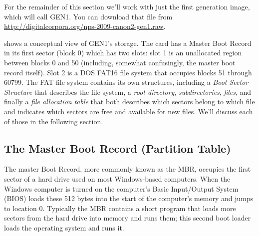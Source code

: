 For the remainder of this section we'll work with just the first
generation image, which will call GEN1. You can download that file
from \url{http://digitalcorpora.org/nps-2009-canon2-gen1.raw}.


 shows a conceptual view of
GEN1's storage. The card has a Master Boot Record in its
first sector (block 0) which has two slots: slot 1 is an unallocated
region between blocks 0 and 50 (including, somewhat confusingly, the
master boot record itself). Slot 2 is a DOS FAT16 file system that
occupies blocks 51 through 60799. The FAT file system contains its own
structures, including a \emph{Boot Sector Structure} that describes the
file system, a \emph{root directory}, \emph{subdirectories},
\emph{files}, and finally a \emph{file allocation table} that both
describes which sectors belong to which file and indicates which
sectors are free and available for new files. We'll discuss each of
those in the following section.

\subsection{The Master Boot Record (Partition Table)}

The master Boot Record, more commonly known as the MBR, occupies the first
sector of a hard drive used on most Windows-based computers. When the
Windows computer is turned on the computer's Basic Input/Output
System (BIOS) loads these 512 bytes into the start of the computer's
memory and jumps to location 0. Typically the MBR contains a short
program that loads more sectors from the hard drive into memory and
runs them; this second boot loader loads the operating system and runs
it.

